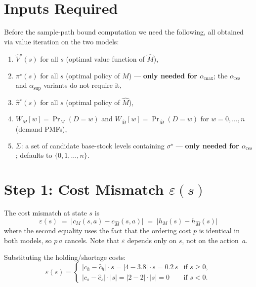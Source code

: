 \documentclass[11pt]{article}
\newcommand{\pistar}{\pi^\star}
\newcommand{\pihatstar}{\hat\pi^\star}
\newcommand{\Vhatstar}{\hat V^\star}
\newcommand{\alphares}{\alpha_{\mathrm{res}}}
\begin{document}
\section{Inputs Required}

Before the sample-path bound computation we need the following, all obtained
via value iteration on the two models:
%
\begin{enumerate}
  \item $\Vhatstar(s)$ for all $s$ \quad (optimal value function of $\hat M$),
  \item $\pistar(s)$ for all $s$ \quad (optimal policy of $M$) ---
        \textbf{only needed for $\alpha_{\max}$}; the $\alphares$ and
        $\alpha_{\sup}$ variants do not require it,
  \item $\pihatstar(s)$ for all $s$ \quad (optimal policy of $\hat M$),
  \item $W_M[w] = \Pr_M(D = w)$ and $W_{\hat M}[w] = \Pr_{\hat M}(D = w)$
        for $w = 0, \ldots, n$ \quad (demand PMFs),
  \item $\Sigma$: a set of candidate base-stock levels containing
        $\sigma^\star$ --- \textbf{only needed for $\alphares$};
        defaults to $\{0, 1, \ldots, n\}$.
\end{enumerate}

\section{Step 1: Cost Mismatch $\varepsilon(s)$}

The cost mismatch at state $s$ is
\begin{equation}\label{eq:epsilon}
  \varepsilon(s)
  \;=\; \bigl|c_M(s, a) - c_{\hat M}(s, a)\bigr|
  \;=\; \bigl|h_M(s) - h_{\hat M}(s)\bigr|
\end{equation}
where the second equality uses the fact that the ordering cost $p$ is identical
in both models, so $p\,a$ cancels.  Note that $\varepsilon$ depends only on
$s$, not on the action~$a$.

Substituting the holding/shortage costs:
\begin{equation}\label{eq:epsilon-explicit}
  \varepsilon(s) =
  \begin{cases}
    |c_h - \hat c_h| \cdot s = |4 - 3.8| \cdot s = 0.2\,s
      & \text{if } s \ge 0, \\[4pt]
    |c_s - \hat c_s| \cdot |s| = |2 - 2| \cdot |s| = 0
      & \text{if } s < 0.
  \end{cases}
\end{equation}
\end{document}
